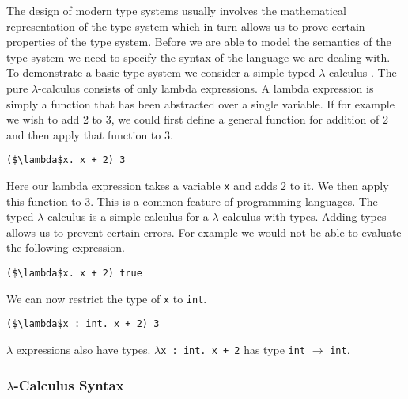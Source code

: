 \documentclass[11pt
              , a4paper
              , twoside
              , openright
              ]{report}
\numberwithin{case}{theorem}
\numberwithin{subcase}{case}
\begin{document}
The design of modern type systems usually involves the mathematical representation of the type system which in turn allows us to prove certain properties of the type system. Before we are able to model the semantics of the type system we need to specify the syntax of the language we are dealing with. To demonstrate a basic type system we consider a simple typed $\lambda$-calculus \cite{church1940formulation, curry1959combinatory, Pierce:2002:TPL:509043, Barendregt:1993:LCT:162552.162561}. The pure $\lambda$-calculus consists of only lambda expressions. A lambda expression is simply a function that has been abstracted over a single variable. If for example we wish to add 2 to 3, we could first define a general function for addition of 2 and then apply that function to 3.
\begin{lstlisting}[mathescape, style=customlang]
($\lambda$x. x + 2) 3
\end{lstlisting}
Here our lambda expression takes a variable \verb|x| and adds 2 to it. We then apply this function to 3. This is a common feature of programming languages. The typed $\lambda$-calculus is a simple calculus for a $\lambda$-calculus with types. Adding types allows us to prevent certain errors. For example we would not be able to evaluate the following expression.
\begin{lstlisting}[mathescape, style=customlang]
($\lambda$x. x + 2) true
\end{lstlisting}
We can now restrict the type of \verb|x| to \verb|int|.
\begin{lstlisting}[mathescape, style=customlang]
($\lambda$x : int. x + 2) 3
\end{lstlisting}
$\lambda$ expressions also have types. $\lambda$\verb|x : int. x + 2| has type \verb|int| $\rightarrow$ \verb|int|. 
\subsubsection{$\lambda$-Calculus Syntax}
\end{document}
